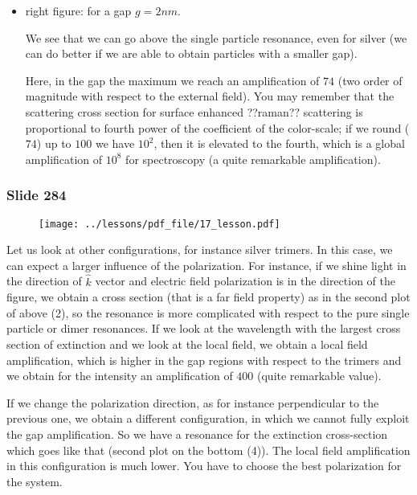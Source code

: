 \documentclass[../main/main.tex]{subfiles}
\begin{document}
\begin{itemize}
\begin{itemize}
    \item {right figure: for a gap $g = 2 nm$}.

    We see that we can go above the single particle resonance, even for silver (we can do better if we are able to obtain particles with a smaller gap).

    Here, in the gap the maximum we reach an amplification of $74$ (two order of magnitude with respect to the external field).
    You may remember that the scattering cross section for surface enhanced ??raman?? scattering is proportional to fourth power of the coefficient of the color-scale; if we round ($74$) up to $100$ we have $10^2$, then it is elevated to the fourth, which is a global amplification of $10^8$ for spectroscopy (a quite remarkable amplification).

\end{itemize}
\end{itemize}


\newpage

\subsubsection{Slide 284}

\begin{figure}[h!]
\centering
\texttt{[image: ../lessons/pdf\_file/17\_lesson.pdf]}
\end{figure}

Let us look at other configurations, for instance silver trimers.
In this case, we can expect a larger influence of the polarization. For instance, if we shine light in the direction of $\hat{k}$ vector and electric field polarization is in the direction of the figure, we obtain a cross section (that is a far field property) as in the second plot of above (2), so the resonance is more complicated with respect to the pure single particle or dimer resonances.
If we look at the wavelength with the largest cross section of extinction and we look at the local field, we obtain a local field amplification, which is higher in the gap regions with respect to the trimers and we obtain for the intensity an amplification of $400$ (quite remarkable value).

If we change the polarization direction, as for instance perpendicular to the previous one, we obtain a different configuration, in which we cannot fully exploit the gap amplification. So we have a resonance for the extinction cross-section which goes like that (second plot on the bottom (4)). The local field amplification in this configuration is much lower. You have to choose the best polarization for the system.
\end{document}
